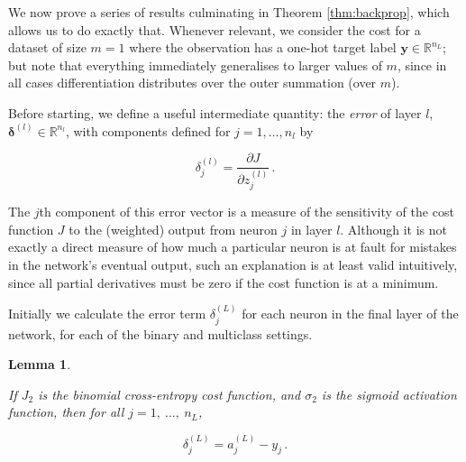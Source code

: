 \documentclass{article}[11pt]
\newtheorem{lemma}{Lemma}
\begin{document}
        We now prove a series of results culminating in Theorem \ref{thm:backprop}, which allows us to do exactly that. Whenever relevant, we consider the cost for a dataset of size $m = 1$ where the observation has a one-hot target label $\mathbf{y} \in \mathbb{R}^{n_L}$; but note that everything immediately generalises to larger values of $m$, since in all cases differentiation distributes over the outer summation (over $m$).
        
        Before starting, we define a useful intermediate quantity: the \textit{error} of layer $l$, $\boldsymbol{\delta}^{(l)} \in \mathbb{R}^{n_l}$, with components defined for $j = 1, \ldots, n_l$ by
        
        $$
        \delta^{(l)}_j = \frac{\partial J}{\partial z^{(l)}_j} \,.
        $$
        
        The $j$th component of this error vector is a measure of the sensitivity of the cost function $J$ to the (weighted) output from neuron $j$ in layer $l$. Although it is not exactly a direct measure of how much a particular neuron is at fault for mistakes in the network's eventual output, such an explanation is at least valid intuitively, since all partial derivatives must be zero if the cost function is at a minimum.
        
        Initially we calculate the error term $\delta^{(L)}_j$ for each neuron in the final layer of the network, for each of the binary and multiclass settings.
        
        
        \begin{lemma} \label{thm:init_sigmoid}
            
            If $J_2$ is the binomial cross-entropy cost function, and $\sigma_2$ is the sigmoid activation function, then for all $j = 1, \ \ldots, \ n_L$,
            
            $$
            \delta^{(L)}_j = a^{(L)}_j - y_j \,.
            $$
            
        \end{lemma}
        
\end{document}
